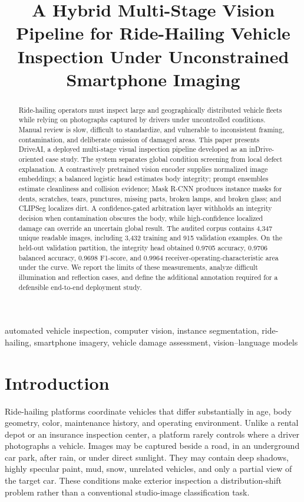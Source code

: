 \documentclass[conference]{IEEEtran}
\title{A Hybrid Multi-Stage Vision Pipeline for Ride-Hailing Vehicle Inspection Under Unconstrained Smartphone Imaging}
\author{%
\IEEEauthorblockN{Alish Akadil}
\IEEEauthorblockA{Independent Researcher\\
Scientific Supervisor: Kaiyrkhan Nurym}
}
\begin{document}
\maketitle

\begin{abstract}
Ride-hailing operators must inspect large and geographically distributed vehicle fleets while relying on photographs captured by drivers under uncontrolled conditions. Manual review is slow, difficult to standardize, and vulnerable to inconsistent framing, contamination, and deliberate omission of damaged areas. This paper presents DriveAI, a deployed multi-stage visual inspection pipeline developed as an inDrive-oriented case study. The system separates global condition screening from local defect explanation. A contrastively pretrained vision encoder supplies normalized image embeddings; a balanced logistic head estimates body integrity; prompt ensembles estimate cleanliness and collision evidence; Mask R-CNN produces instance masks for dents, scratches, tears, punctures, missing parts, broken lamps, and broken glass; and CLIPSeg localizes dirt. A confidence-gated arbitration layer withholds an integrity decision when contamination obscures the body, while high-confidence localized damage can override an uncertain global result. The audited corpus contains 4,347 unique readable images, including 3,432 training and 915 validation examples. On the held-out validation partition, the integrity head obtained 0.9705 accuracy, 0.9706 balanced accuracy, 0.9698 F1-score, and 0.9964 receiver-operating-characteristic area under the curve. We report the limits of these measurements, analyze difficult illumination and reflection cases, and define the additional annotation required for a defensible end-to-end deployment study.
\end{abstract}

\begin{IEEEkeywords}
automated vehicle inspection, computer vision, instance segmentation, ride-hailing, smartphone imagery, vehicle damage assessment, vision--language models
\end{IEEEkeywords}

\section{Introduction}

Ride-hailing platforms coordinate vehicles that differ substantially in age, body geometry, color, maintenance history, and operating environment. Unlike a rental depot or an insurance inspection center, a platform rarely controls where a driver photographs a vehicle. Images may be captured beside a road, in an underground car park, after rain, or under direct sunlight. They may contain deep shadows, highly specular paint, mud, snow, unrelated vehicles, and only a partial view of the target car. These conditions make exterior inspection a distribution-shift problem rather than a conventional studio-image classification task.
\end{document}
